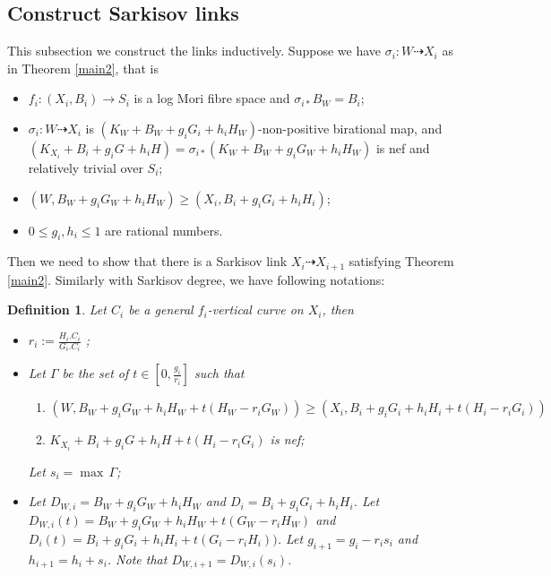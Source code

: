 \documentclass[11pt]{amsart}
\numberwithin{equation}{section}
\newtheorem{defn}{Definition}[subsection]
\begin{document}
\subsection{Construct Sarkisov links}
This subsection we construct the links inductively. Suppose we have $\sigma_{i}:W\dashrightarrow X_{i}$ as in Theorem  \ref{main2}, that is 
\begin{itemize}
  \item $f_{i}:(X_{i},B_{i})\to S_{i}$ is a log Mori fibre space and $\sigma_{i*} B_{W}=B_{i}$;
  \item $\sigma_{i}:W\dashrightarrow  X_{i}$ is $(K_{W}+B_{W}+g_{i}G_{i}+h_{i}H_{W})$-non-positive birational map, and $(K_{X_{i}}+B_{i}+g_{i}G+h_{i}H)=\sigma_{i*}(K_{W}+B_{W}+g_{i}G_{W}+h_{i}H_{W})$ is nef and  relatively trivial over $S_{i}$;
  \item $(W,B_{W}+g_{i}G_{W}+h_{i}H_{W})\geqslant (X_{i},B_{i}+g_{i}G_{i}+h_{i}H_{i})$;
  \item $0\leqslant g_{i},h_{i}\leqslant 1$ are  rational numbers.
\end{itemize}
Then we need to show that there is a Sarkisov link $X_{i}\dashrightarrow X_{i+1}$ satisfying  Theorem \ref{main2}. Similarly with Sarkisov degree, we have following notations:
\begin{defn}
  Let $C_{i}$ be a general $f_{i}$-vertical curve on $X_{i}$, then
  \begin{itemize}
    \item $r_{i}:=\frac{H_{i}.C_{i}}{G_{i}.C_{i}}$ ;
    \item Let $\Gamma$ be the set of $t\in [0,\frac{g_{i}}{r_{i}}] $ such that 
      \begin{enumerate}
        \item\label{singularcondition} $\left(W,B_{W}+g_{i}G_{W}+h_{i}H_{W}+t(H_{W}-r_{i}G_{W})\right)\geqslant \left(X_{i},B_{i}+g_{i}G_{i}+h_{i}H_{i}+t\left(H_{i}-r_{i}G_{i}\right)\right)$
        \item$K_{X_{i}}+B_{i}+g_{i}G+h_{i}H+t(H_{i}-r_{i}G_{i})$ is nef;
    \end{enumerate}
    Let $s_{i}=\max\, \Gamma $;
\item Let $D_{W,i}=B_{W}+g_{i}G_{W}+h_{i}H_{W}$ and $D_{i}=B_{i}+g_{i}G_{i}+h_{i}H_{i}$. Let $D_{W,i}(t)=B_{W}+g_{i}G_{W}+h_{i}H_{W}+t(G_{W}-r_{i}H_{W})$ and $D_{i}(t)=B_{i}+g_{i}G_{i}+h_{i}H_{i}+t\left(G_{i}-r_{i}H_{i}\right))$. Let $g_{i+1}=g_{i}-r_{i}s_{i}$ and $h_{i+1}=h_{i}+s_{i}$. Note that $D_{W,i+1}=D_{W,i}(s_{i})$. 
  \end{itemize}
\end{defn}
\end{document}
